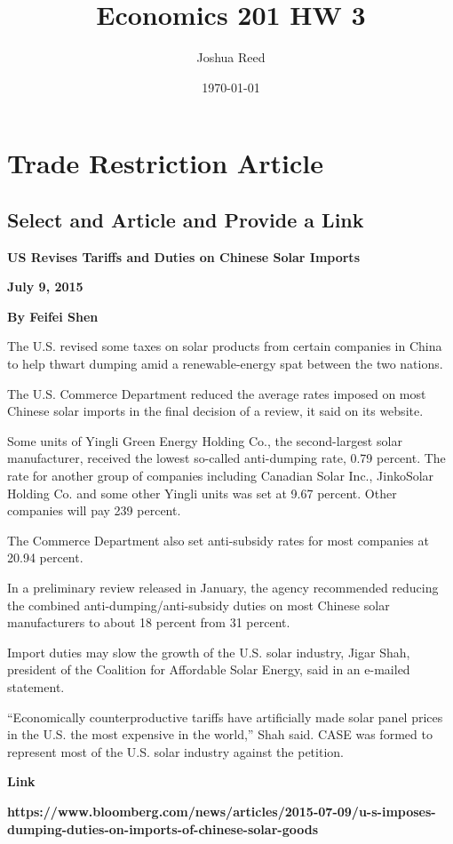 \documentclass[a4paper]{article}
\title{Economics 201 HW 3}
\author{Joshua Reed}
\date{\today}
\begin{document}
\maketitle

\section{Trade Restriction Article}

\subsection{Select and Article and Provide a Link}
\textbf{\large{US Revises Tariffs and Duties on Chinese Solar Imports}}

\textbf{July 9, 2015}

\textbf{By Feifei Shen}


The U.S. revised some taxes on solar products from certain companies in China to help thwart dumping amid a renewable-energy spat between the two nations.

The U.S. Commerce Department reduced the average rates imposed on most Chinese solar imports in the final decision of a review, it said on its website.

Some units of Yingli Green Energy Holding Co., the second-largest solar manufacturer, received the lowest so-called anti-dumping rate, 0.79 percent. The rate for another group of companies including Canadian Solar Inc., JinkoSolar Holding Co. and some other Yingli units was set at 9.67 percent. Other companies will pay 239 percent.

The Commerce Department also set anti-subsidy rates for most companies at 20.94 percent.

In a preliminary review released in January, the agency recommended reducing the combined anti-dumping/anti-subsidy duties on most Chinese solar manufacturers to about 18 percent from 31 percent.

Import duties may slow the growth of the U.S. solar industry, Jigar Shah, president of the Coalition for Affordable Solar Energy, said in an e-mailed statement.

“Economically counterproductive tariffs have artificially made solar panel prices in the U.S. the most expensive in the world,” Shah said. CASE was formed to represent most of the U.S. solar industry against the petition.

\textbf{\large{Link}}

\textbf{https://www.bloomberg.com/news/articles/2015-07-09/u-s-imposes-dumping-duties-on-imports-of-chinese-solar-goods}
\end{document}
